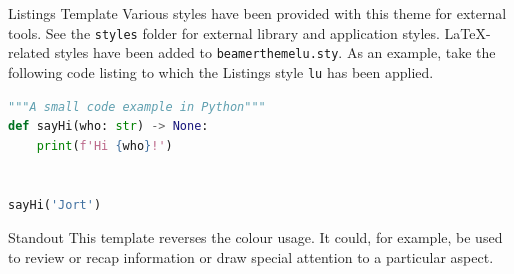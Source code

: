 \documentclass[aspectratio=169, 10pt]{beamer}
\begin{document}
    \begin{frame}[fragile]{Listings Template}
        Various styles have been provided with this theme for external tools. See the \texttt{styles} folder for external library and application styles. LaTeX-related styles have been added to \texttt{beamerthemelu.sty}. As an example, take the following code listing to which the Listings style \texttt{lu} has been applied.

        \begin{lstlisting}[language=python, style=lu]
"""A small code example in Python"""
def sayHi(who: str) -> None:
    print(f'Hi {who}!')


sayHi('Jort')
        \end{lstlisting}
    \end{frame}

    \begin{frame}[c, standout]{Standout}
        This template reverses the colour usage. It could, for example, be used to review or recap information or draw special attention to a particular aspect.
    \end{frame}

    \begin{frame}[plain]
    \end{frame}

\end{document}
